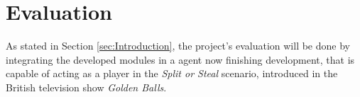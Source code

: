\section{Evaluation}
\label{sec:Evaluation}
As stated in Section \ref{sec:Introduction}, the project's evaluation will be done by integrating the developed modules in a agent now finishing development, that is capable of acting as a player in the \textit{Split or Steal} scenario, introduced in the British television show \textit{Golden Balls}\cite{Wikipedia.Golden.Balls}.